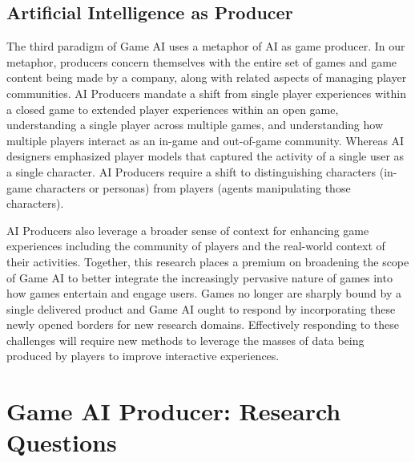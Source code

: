 \documentclass[conference]{IEEEtran}
\newcommand{\mytodo}[1]{\textbf{[[#1]]}}
\begin{document}
\subsection{Artificial Intelligence as Producer}

The third paradigm of Game AI uses a metaphor of AI as game producer. 
In our metaphor, producers concern themselves with the entire set of games and game content being made by a company, along with related aspects of managing player communities. 
AI Producers mandate a shift from single player experiences within a closed game to extended player experiences within an open game, understanding a single player across multiple games, and understanding how multiple players interact as an in-game and out-of-game community. 
Whereas AI designers emphasized player models that captured the activity of a single user as a single character. AI Producers require a shift to distinguishing characters (in-game characters or personas) from players (agents manipulating those characters). 

AI Producers also leverage a broader sense of context for enhancing game experiences including the community of players and the real-world context of their activities.
Together, this research places a premium on broadening the scope of Game AI to better integrate the increasingly pervasive nature of games into how games entertain and engage users. Games no longer are sharply bound by a single delivered product and Game AI ought to respond by incorporating these newly opened borders for new research domains. Effectively responding to these challenges will require new methods to leverage the masses of data being produced by players to improve interactive experiences.



\section{Game AI Producer: Research Questions}
\end{document}
